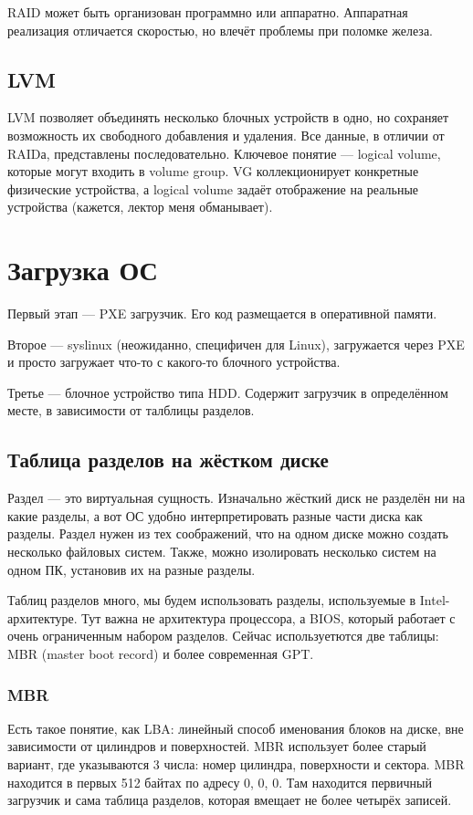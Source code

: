 \documentclass[main]{subfiles}
\begin{document}
RAID может быть организован программно или аппаратно. Аппаратная реализация
отличается скоростью, но влечёт проблемы при поломке железа.

\section{LVM}
LVM позволяет объединять несколько блочных устройств в одно, но сохраняет
возможность их свободного добавления и удаления. Все данные, в отличии
от RAIDа, представлены последовательно.
Ключевое понятие --- logical volume, которые могут входить в volume group.
VG коллекционирует конкретные физические устройства, а logical volume
задаёт отображение на реальные устройства (кажется, лектор меня обманывает).

\chapter{Загрузка ОС}
Первый этап --- PXE загрузчик. Его код размещается в оперативной памяти.

Второе --- syslinux (неожиданно, специфичен для Linux), загружается через
PXE и просто загружает что-то с какого-то блочного устройства.

Третье --- блочное устройство типа HDD. Содержит загрузчик в определённом
месте, в зависимости от талблицы разделов.

\section{Таблица разделов на жёстком диске}
Раздел --- это виртуальная сущность. Изначально жёсткий диск не разделён
ни на какие разделы, а вот ОС удобно интерпретировать разные части диска как
разделы. Раздел нужен из тех соображений, что на одном диске можно создать
несколько файловых систем. Также, можно изолировать несколько систем на одном
ПК, установив их на разные разделы.

Таблиц разделов много, мы будем использовать разделы, используемые в Intel-архитектуре.
Тут важна не архитектура процессора, а BIOS, который работает с очень ограниченным
набором разделов. Сейчас используетются две таблицы:
MBR (master boot record) и более современная GPT.

\subsection{MBR}
Есть такое понятие, как LBA: линейный способ именования блоков на диске,
вне зависимости от цилиндров и поверхностей. MBR использует более старый
вариант, где указываются 3 числа: номер цилиндра, поверхности и сектора.
MBR находится в первых 512 байтах по адресу 0, 0, 0. Там находится первичный
загрузчик и сама таблица разделов, которая вмещает не более четырёх записей.
\end{document}
